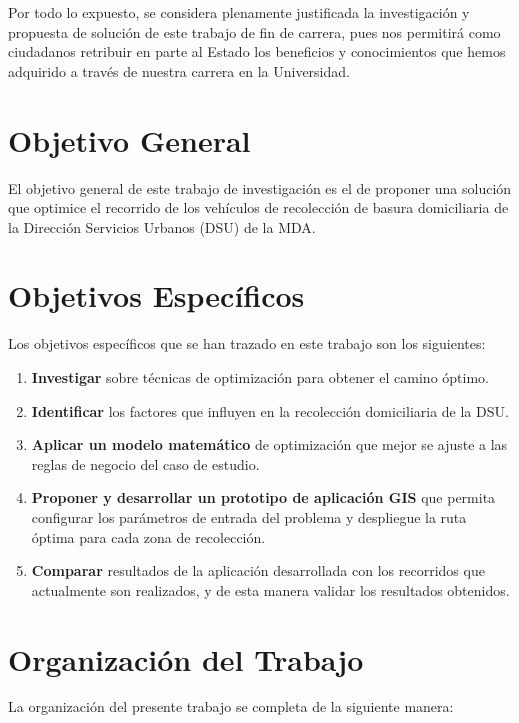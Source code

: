 Por todo lo expuesto, se considera plenamente justificada la investigación y propuesta de solución de este trabajo de fin de carrera, pues nos permitirá como ciudadanos retribuir en parte al Estado los beneficios y conocimientos que hemos adquirido a través de nuestra carrera en la Universidad.

\section{Objetivo General}
El objetivo general de este trabajo de investigación es el de proponer una solución que optimice el recorrido de los vehículos de recolección de basura domiciliaria de la Dirección Servicios Urbanos (DSU) de la MDA.

\section{Objetivos Específicos}

Los objetivos específicos que se han trazado en este trabajo son los siguientes:

\begin{enumerate}
    \item \textbf{Investigar} sobre técnicas de optimización para obtener el camino óptimo. 
    \item \textbf{Identificar} los factores que influyen en la recolección domiciliaria de la DSU.
    \item \textbf{Aplicar un modelo matemático} de optimización que mejor se ajuste a las reglas de negocio del caso de estudio.
    \item \textbf{Proponer y desarrollar un prototipo de aplicación GIS} que permita configurar los parámetros de entrada del problema y despliegue la ruta óptima para cada zona de recolección.
    \item \textbf{Comparar} resultados de la aplicación desarrollada con los recorridos que actualmente son realizados, y de esta manera validar los resultados obtenidos.
\end{enumerate}


\section{Organización del Trabajo}

La organización del presente trabajo se completa de la siguiente manera:

